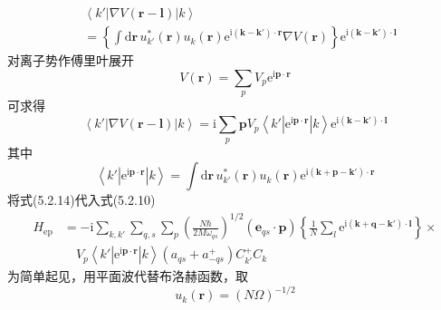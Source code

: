 \begin{equation}
\begin{aligned}
  &\left\langle k'\left|\nabla V\left(\boldsymbol{r}-\boldsymbol{l}\right)\right|k\right\rangle\\
  &=\left\{\int\mathrm{d}\boldsymbol{r}\,u_{k'}^{*}\left(\boldsymbol{r}\right)u_k\left(\boldsymbol{r}\right)
  \mathrm{e}^{\mathrm{i}\left(\boldsymbol{k}-\boldsymbol{k}'\right)\cdot\boldsymbol{r}}\nabla V\left(\boldsymbol{r}\right)\right\}
  \mathrm{e}^{\mathrm{i}\left(\boldsymbol{k}-\boldsymbol{k}'\right)\cdot\boldsymbol{l}}
\end{aligned}
\end{equation}
对离子势作傅里叶展开
\begin{equation}
  V\left(\boldsymbol{r}\right)=\sum_{p}V_p\mathrm{e}^{\mathrm{i}\boldsymbol{p}\cdot\boldsymbol{r}}
\end{equation}
可求得
\begin{equation}
  \left\langle k'\left|\nabla V\left(\boldsymbol{r}-\boldsymbol{l}\right)\right|k\right\rangle
  =\mathrm{i}\sum_{p}\boldsymbol{p}V_p\left\langle k'\left|\mathrm{e}^{\mathrm{i}\boldsymbol{p}\cdot\boldsymbol{r}}\right|k\right\rangle
  \mathrm{e}^{\mathrm{i}\left(\boldsymbol{k}-\boldsymbol{k}'\right)\cdot\boldsymbol{l}}
\end{equation}
其中
\begin{equation}
  \left\langle k'\left|\mathrm{e}^{\mathrm{i}\boldsymbol{p}\cdot\boldsymbol{r}}\right|k\right\rangle
  =\int\mathrm{d}\boldsymbol{r}\,u_{k'}^{*}\left(\boldsymbol{r}\right)u_k\left(\boldsymbol{r}\right)
  \mathrm{e}^{\mathrm{i}\left(\boldsymbol{k}+\boldsymbol{p}-\boldsymbol{k}'\right)\cdot\boldsymbol{r}}
\end{equation}
将式(5.2.14)代入式(5.2.10)
\begin{equation}
\begin{aligned}
  H_{\mathrm{ep}}&=-\mathrm{i}\sum_{k,k'}\sum_{q,s}\sum_{p}\left(\frac{N\hbar}{2M\omega_{qs}}\right)^{1/2}
  \left(\boldsymbol{e}_{qs}\cdot\boldsymbol{p}\right)
  \left\{\frac{1}{N}\sum_{l}\mathrm{e}^{\mathrm{i}\left(\boldsymbol{k}+\boldsymbol{q}-\boldsymbol{k}'\right)\cdot\boldsymbol{l}}\right\}\times\\
  &\quad V_p\left\langle k'\left|\mathrm{e}^{\mathrm{i}\boldsymbol{p}\cdot\boldsymbol{r}}\right|k\right\rangle
  \left(a_{qs}+a_{-qs}^{+}\right)C_{k'}^{+}C_k
\end{aligned}
\end{equation}
为简单起见，用平面波代替布洛赫函数，取
\begin{equation}
  u_k\left(\boldsymbol{r}\right)=\left(N\Omega\right)^{-1/2}
\end{equation}
